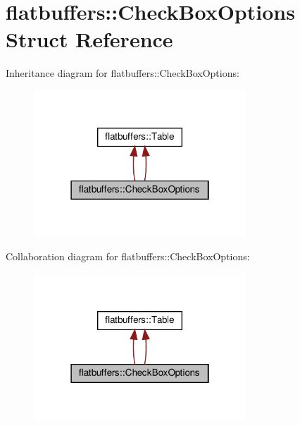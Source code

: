 \hypertarget{structflatbuffers_1_1CheckBoxOptions}{}\section{flatbuffers\+:\+:Check\+Box\+Options Struct Reference}
\label{structflatbuffers_1_1CheckBoxOptions}


Inheritance diagram for flatbuffers\+:\+:Check\+Box\+Options\+:
\nopagebreak
\begin{figure}[H]
\begin{center}
\leavevmode
\includegraphics[width=226pt]{structflatbuffers_1_1CheckBoxOptions__inherit__graph}
\end{center}
\end{figure}


Collaboration diagram for flatbuffers\+:\+:Check\+Box\+Options\+:
\nopagebreak
\begin{figure}[H]
\begin{center}
\leavevmode
\includegraphics[width=226pt]{structflatbuffers_1_1CheckBoxOptions__coll__graph}
\end{center}
\end{figure}
